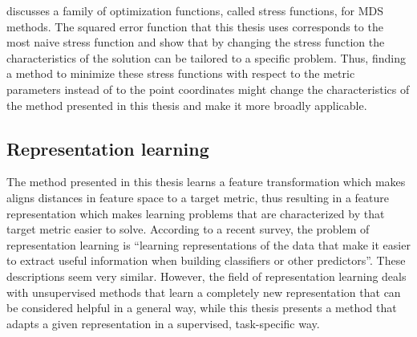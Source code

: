 \cite{chen2013stress} discusses a family of optimization functions, called stress functions, for \ac{MDS} methods. The squared error function that this thesis uses corresponds to the most naive stress function and \cite{chen2013stress} show that by changing the stress function the characteristics of the solution can be tailored to a specific problem. Thus, finding a method to minimize these stress functions with respect to the metric parameters instead of to the point coordinates might change the characteristics of the method presented in this thesis and make it more broadly applicable.



\subsection{Representation learning}

The method presented in this thesis learns a feature transformation which makes aligns distances in feature space to a target metric, thus resulting in a feature representation which makes learning problems that are characterized by that target metric easier to solve. According to a recent survey, the problem of representation learning is ``learning representations of the data that make it easier to extract useful information when building classiﬁers or other predictors''. \cite{bengio2013representation} These descriptions seem very similar. However, the field of representation learning deals with unsupervised methods that learn a completely new representation that can be considered helpful in a general way, while this thesis presents a method that adapts a given representation in a supervised, task-specific way.








